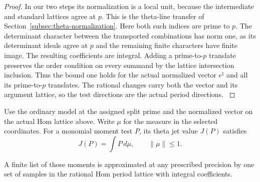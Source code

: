 \begin{proof}
In our two steps its normalization is a local unit, because
the intermediate and standard lattices agree at \(p\).
This is the theta-line transfer of Section~\ref{subsec:theta-normalization}.
Here both such indices are prime to \(p\).
The determinant character between the transported
combinations has norm one, as its determinant ideals
agree at \(p\) and the remaining finite characters
have finite image. The resulting coefficients are
integral. Adding a prime-to-\(p\) translate preserves
the order condition on every summand by the lattice
intersection inclusion. Thus the bound one holds for
the actual normalized vector \(e^\natural\) and all
its prime-to-\(p\) translates. The rational changes
carry both the vector and its argument lattice, so
the test directions are the actual period directions.
\label{cor:word-measure-5}

\end{proof}

\begin{proposition}\label{prop:theta-measure-word}
Use the ordinary model at the assigned split prime and
the normalized vector on the actual Hom lattice above.
Write \(\mu\) for the measure in the selected coordinates. For a monomial moment test \(P\), its theta jet value \(J(P)\) satisfies
\[
 J(P)=\int P\,d\mu,\qquad \|\mu\|\le1.
\]

A finite list of those moments is approximated at any
prescribed precision by one set of samples in the
rational Hom period lattice with integral coefficients.
\end{proposition}

